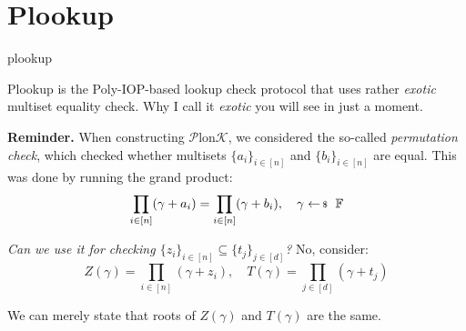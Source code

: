\documentclass{zkdl-presentation-template}
\begin{document}
    \section{Plookup}

    \begin{frame}{plookup}
        \begin{definition}
            Plookup is the Poly-IOP-based lookup check protocol that uses rather
            \textit{exotic} multiset equality check. Why I call it
            \textit{exotic} you will see in just a moment.\pause
        \end{definition}

        \textbf{Reminder.} When constructing $\mathcal{P}$lon$\mathcal{K}$, we considered the
        so-called \textit{permutation check}, which checked whether
        multisets $\{a_i\}_{i \in [n]}$ and $\{b_i\}_{i \in [n]}$ are equal.\pause\hspace{1.0px} This was done by running 
        the grand product:
        \begin{equation*}
            \prod_{i \in [n]} (\gamma+a_i) = \prod_{i \in [n]}(\gamma+b_i), \quad \gamma \leftarrowS \mathbb{F}
        \end{equation*}

        \vspace{-15px}

        \pause\textit{Can we use it for checking $\{z_i\}_{i\in [n]} \subseteq
        \{t_j\}_{j \in [d]}$?}\pause\hspace{1.0px} No, consider:
        \begin{equation*}
            Z(\gamma) = \prod_{i \in [n]} (\gamma + z_i), \quad T(\gamma) = \prod_{j \in [d]} (\gamma + t_j)
        \end{equation*}

        \vspace{-15px}

        We can merely state that roots of $Z(\gamma)$ and $T(\gamma)$ are the
        same.
    \end{frame}
\end{document}
